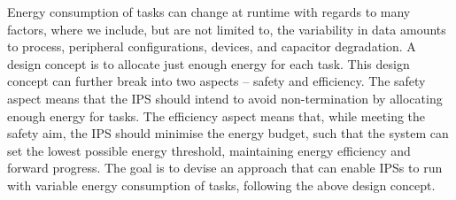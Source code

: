 \begin{enumerate}
Energy consumption of tasks can change at runtime with regards to many factors, where we include, but are not limited to, the variability in data amounts to process, peripheral configurations, devices, and capacitor degradation. 
A design concept is to allocate just enough energy for each task.
This design concept can further break into two aspects -- safety and efficiency. 
The safety aspect means that the IPS should intend to avoid non-termination by allocating enough energy for tasks.
The efficiency aspect means that, while meeting the safety aim, the IPS should minimise the energy budget, such that the system can set the lowest possible energy threshold, maintaining energy efficiency and forward progress. 
The goal is to devise an approach that can enable IPSs to run with variable energy consumption of tasks, following the above design concept. 





\end{enumerate}
